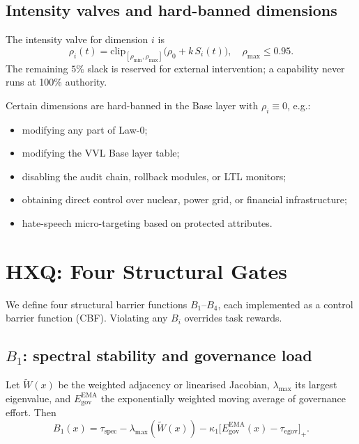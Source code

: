\documentclass[11pt]{article}
\begin{document}
\subsection{Intensity valves and hard-banned dimensions}

The intensity valve for dimension $i$ is
\begin{equation}
\rho_i(t) = \mathrm{clip}_{[\rho_{\min},\rho_{\max}]}\big(\rho_0 + k\,S_i(t)\big),
\quad
\rho_{\max}\le0.95.
\label{eq:rho}
\end{equation}
The remaining $5\%$ slack is reserved for external intervention; a capability never runs at 100\% authority.

Certain dimensions are hard-banned in the Base layer with $\rho_i\equiv 0$, e.g.:
\begin{itemize}[leftmargin=1.8em]
  \item modifying any part of Law-0;
  \item modifying the VVL Base layer table;
  \item disabling the audit chain, rollback modules, or LTL monitors;
  \item obtaining direct control over nuclear, power grid, or financial infrastructure;
  \item hate-speech micro-targeting based on protected attributes.
\end{itemize}

\section{HXQ: Four Structural Gates}
\label{sec:hxq}

We define four structural barrier functions $B_1$--$B_4$, each implemented as a control barrier function (CBF). Violating any $B_i$ overrides task rewards.

\subsection{$B_1$: spectral stability and governance load}

Let $\widetilde W(x)$ be the weighted adjacency or linearised Jacobian, $\lambda_{\max}$ its largest eigenvalue, and $E_{\mathrm{gov}}^{\mathrm{EMA}}$ the exponentially weighted moving average of governance effort. Then
\begin{equation}
B_1(x) 
= \tau_{\mathrm{spec}} - \lambda_{\max}(\widetilde W(x))
- \kappa_1\big[E_{\mathrm{gov}}^{\mathrm{EMA}}(x) - \tau_{\mathrm{egov}}\big]_+.
\end{equation}
\end{document}
